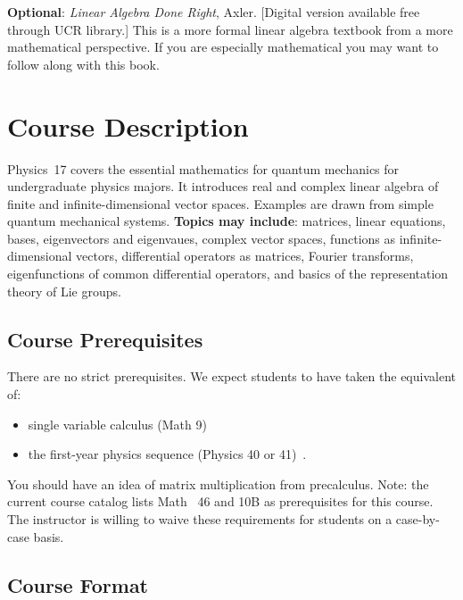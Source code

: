\documentclass[12pt]{article}
\numberwithin{equation}{section}    %
\begin{document}
\noindent\textbf{Optional}: \emph{Linear Algebra Done Right}, Axler. [Digital version available free through UCR library.] This is a more formal linear algebra textbook from a more mathematical perspective. If you are especially mathematical you may want to follow along with this book.
\vspace{.5em}




\section{Course Description}

Physics~17 covers the essential mathematics for quantum mechanics for undergraduate physics majors. It introduces real and complex linear algebra of finite and infinite-dimensional vector spaces. Examples are drawn from simple quantum mechanical systems. \textbf{Topics may include}: matrices, linear equations, bases, eigenvectors and eigenvaues, complex vector spaces, functions as infinite-dimensional vectors, differential operators as matrices, Fourier transforms, eigenfunctions of common differential operators, and basics of the representation theory of Lie groups.

\subsection{Course Prerequisites}

There are no strict prerequisites. We expect students to have taken the equivalent of:
\begin{itemize}
	\item single variable calculus (Math 9)
	\item the first-year physics sequence (Physics 40 or 41)\ .
\end{itemize}
You should have an idea of matrix multiplication from precalculus. Note: the current course catalog lists Math ~46 and 10B as prerequisites for this course. The instructor is willing to waive these requirements for students on a case-by-case basis.

\subsection{Course Format}
\end{document}
